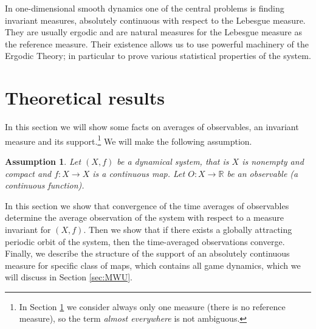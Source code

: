 \documentclass[format=acmsmall, authorversion, screen=true]{acmart}
\newtheorem{assumption}{Assumption}
\def\R{\ensuremath{\mathbb{R}}}
\begin{document}
In one-dimensional smooth dynamics one of the central problems is
finding invariant measures, absolutely continuous with respect to the
Lebesgue measure. They are usually ergodic and are natural
measures for the Lebesgue measure as the reference measure. Their
existence allows us to use powerful machinery of the Ergodic Theory;
in particular to prove various statistical properties of the system.


\section{Theoretical results}\label{Th-results}
\label{sec:theo}
 In this section we will show some facts on averages of observables, an invariant measure and its support.\footnote{In Section \ref{Th-results} we consider always only one measure
(there is no reference measure), so the term {\it almost everywhere} is not ambiguous.} 
We will make the following assumption.

\begin{assumption}\label{as1}
Let $(X,f)$ be a dynamical system, that is $X$ is nonempty and compact and $f\colon X \to X$ is a continuous map. Let $O\colon X\to\R$ be an observable (a continuous function).
\end{assumption}

In this section we show that convergence of the time averages of observables determine %
the average observation of the system with respect to a measure invariant for $(X,f)$. Then we show that if there exists a globally attracting periodic orbit of the system, then the time-averaged observations converge. Finally, we describe the structure of the support of an absolutely continuous measure for specific class of maps, which contains all game dynamics, which we will discuss in Section \ref{sec:MWU}.
\end{document}
